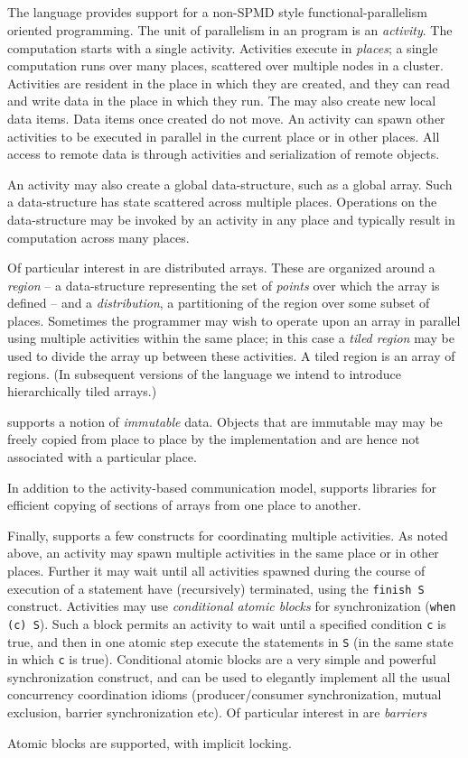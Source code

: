 \subsection{\Xten}
The \Xten{} language provides support for a non-SPMD style
functional-parallelism oriented programming. The unit of parallelism
in an \Xten{} program is an {\em activity}. The \Xten{} computation
starts with a single activity. Activities execute in {\em places}; a
single \Xten{} computation runs over many places, scattered over
multiple nodes in a cluster. Activities are resident in the place in
which they are created, and they can read and write data in the place
in which they run. The may also create new local data items. Data
items once created do not move. An activity can spawn other activities
to be executed in parallel in the current place or in other places.
All access to remote data is through activities and serialization of
remote objects.

An activity may also create a global data-structure, such as a global
array. Such a data-structure has state scattered across multiple
places. Operations on the data-structure may be invoked by an activity
in any place and typically result in computation across many places.

Of particular interest in \Xten{} are distributed arrays. These are
organized around a {\em region} -- a data-structure representing the
set of {\em points} over which the array is defined -- and a {\em
distribution}, a partitioning of the region over some subset of
places. Sometimes the programmer may wish to operate upon an array in
parallel using multiple activities within the same place; in this case
a {\em tiled region} may be used to divide the array up between these
activities. A tiled region is an array of regions. (In subsequent
versions of the language we intend to introduce hierarchically tiled
arrays.)

{}\Xten{} supports a notion of {\em immutable} data. Objects that are
immutable may may be freely copied from place to place by the
implementation and are hence not associated with a particular place.

In addition to the activity-based communication model, \Xten{}
supports libraries for efficient copying of sections of arrays from
one place to another.

Finally, \Xten{} supports a few constructs for coordinating multiple
activities. As noted above, an activity may spawn multiple activities
in the same place or in other places. Further it may wait until all
activities spawned during the course of execution of a statement have
(recursively) terminated, using the {\tt finish S}
construct. Activities may use {\em conditional atomic blocks} for
synchronization ({\tt when (c) S}). Such a block permits an activity
to wait until a specified condition {\tt c} is true, and then in one
atomic step execute the statements in {\tt S} (in the same state in
which {\tt c} is true). Conditional atomic blocks are a very simple
and powerful synchronization construct, and can be used to elegantly
implement all the usual concurrency coordination idioms
(producer/consumer synchronization, mutual exclusion, barrier
synchronization etc). Of particular interest in \Xten{} are {\em barriers}


Atomic blocks are supported, with implicit locking.